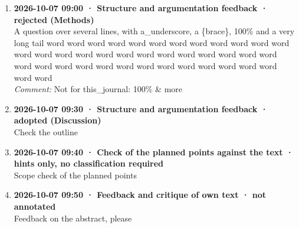 \begin{enumerate}
  \item \textbf{2026-10-07 09:00 · Structure and argumentation feedback · rejected (Methods)} \\
  A question over several lines, with a\_underscore, a \{brace\}, 100\% and a very long tail word word word word word word word word word word word word word word word word word word word word word word word word word word word word word word word word word word word word word word word word
  \\ \textit{Comment:} Not for this\_journal: 100\% \& more
  \item \textbf{2026-10-07 09:30 · Structure and argumentation feedback · adopted (Discussion)} \\
  Check the outline
  \item \textbf{2026-10-07 09:40 · Check of the planned points against the text · hints only, no classification required} \\
  Scope check of the planned points
  \item \textbf{2026-10-07 09:50 · Feedback and critique of own text · not annotated} \\
  Feedback on the abstract, please
\end{enumerate}

